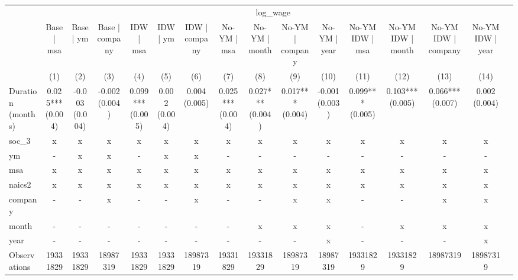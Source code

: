\renewcommand\cellalign{t}
\begin{threeparttable}
\begin{tabular}{lccccccccccccccc}
\toprule
 & \multicolumn{14}{c}{log_wage} \\
\cmidrule(lr){2-15} 
 & Base | msa & Base | ym & Base | company & IDW | msa & IDW | ym & IDW | company & No-YM | msa & No-YM | month & No-YM | company & No-YM | year & No-YM IDW | msa & No-YM IDW | month & No-YM IDW | company & No-YM IDW | year \\
 & (1) & (2) & (3) & (4) & (5) & (6) & (7) & (8) & (9) & (10) & (11) & (12) & (13) & (14) \\
\midrule
\addlinespace
Duration (months) & \makecell{0.025*** \\ (0.004)} & \makecell{-0.003 \\ (0.004)} & \makecell{-0.002 \\ (0.004)} & \makecell{0.099*** \\ (0.005)} & \makecell{0.002 \\ (0.004)} & \makecell{0.004 \\ (0.005)} & \makecell{0.025*** \\ (0.004)} & \makecell{0.027*** \\ (0.004)} & \makecell{0.017*** \\ (0.004)} & \makecell{-0.001 \\ (0.003)} & \makecell{0.099*** \\ (0.005)} & \makecell{0.103*** \\ (0.005)} & \makecell{0.066*** \\ (0.007)} & \makecell{0.002 \\ (0.004)} \\
\midrule
\addlinespace
soc_3 & x & x & x & x & x & x & x & x & x & x & x & x & x & x \\
ym & - & x & x & - & x & x & - & - & - & - & - & - & - & - \\
msa & x & x & x & x & x & x & x & x & x & x & x & x & x & x \\
naics2 & x & x & x & x & x & x & x & x & x & x & x & x & x & x \\
company & - & - & x & - & - & x & - & - & x & x & - & - & x & x \\
month & - & - & - & - & - & - & - & x & x & x & - & x & x & x \\
year & - & - & - & - & - & - & - & - & - & x & - & - & - & x \\
\midrule
\addlinespace
Observations & 19331829 & 19331829 & 18987319 & 19331829 & 19331829 & 18987319 & 19331829 & 19331829 & 18987319 & 18987319 & 19331829 & 19331829 & 18987319 & 18987319 \\

\end{tabular}
\end{threeparttable}
